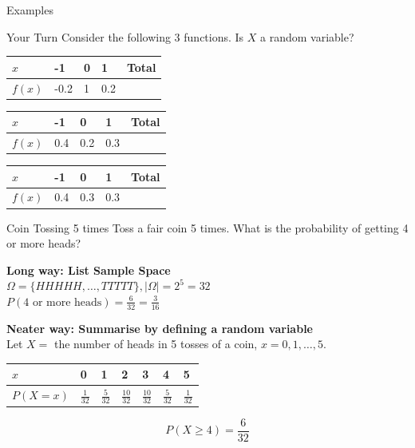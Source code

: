 \documentclass[t,xcolor=pdftex,dvipsnames,table]{beamer}\usepackage[]{graphicx}\usepackage[]{color}
\begin{document}
\begin{frame}[fragile]{Examples}
\begin{alertblock}{Your Turn}
Consider the following 3 functions. Is $X$ a random variable?

\begin{center}
\begin{tabular}{|l|l|l|l|l|} \hline
$x$ & -1 & 0 & 1 & Total \\ \hline
$f(x)$ & -0.2 & 1 & 0.2 & \\ \hline
\end{tabular}
\end{center}

\begin{center}
\begin{tabular}{|l|l|l|l|l|} \hline
$x$ & -1 & 0 & 1 & Total \\ \hline
$f(x)$ & 0.4 & 0.2 & 0.3 & \\ \hline
\end{tabular}
\end{center}

\begin{center}
\begin{tabular}{|l|l|l|l|l|} \hline
$x$ & -1 & 0 & 1 & Total \\ \hline
$f(x)$ & 0.4 & 0.3 & 0.3 & \\ \hline
\end{tabular}
\end{center}
\end{alertblock}
\end{frame}

\begin{frame}{}
\begin{block}{Coin Tossing 5 times}
Toss a fair coin 5 times. What is the probability of getting 4 or more heads?

\vspace{.5cm}
{\bf Long way: List Sample Space}  \\
$ \Omega = 
\{  HHHHH, \ldots, TTTTT\} , |\Omega| = 2^5 = 32$ \\
$ P( \mbox{4 or more heads})  =  \frac{6}{32} = \frac{3}{16}$ 

\vspace{.5cm}
{\bf Neater way: Summarise by defining a random variable} \\
Let $X = $ the number of heads in 5 tosses of a coin, $x=0,1,\ldots,5$.

\begin{center}
\begin{tabular}{|l|l|l|l|l|l|l|} \hline
$x$ & 0 & 1 & 2 & 3 & 4 & 5  \\ \hline
$P(X=x)$ & $\frac{1}{32}$ & $\frac{5}{32}$ & $\frac{10}{32}$ & $\frac{10}{32}$ & $\frac{5}{32}$ & $\frac{1}{32}$  \\ \hline
\end{tabular}
\end{center}

\[P( X \geq 4)  =  \frac{6}{32}   \]

\end{block}
\end{frame}
\end{document}
